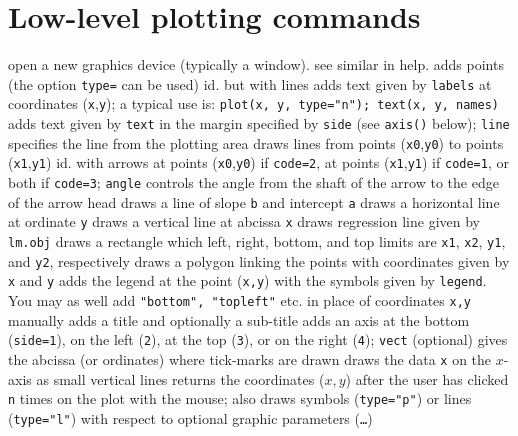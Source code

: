 \section{Low-level plotting commands}{}
	{open a new graphics device (typically a window). see similar in help.}
	{adds points (the option {\tt type=} can be used)}
	{ id. but with lines}
	{ adds text given by {\tt labels} at
    coordinates ({\tt x},{\tt y}); a typical use is: {\tt plot(x, y, type="n");
        text(x, y, names)}}
        	{adds text given by {\tt text} in the margin specified by {\tt side} (see {\tt axis()} below); {\tt line} specifies the line from the plotting area}
	{ draws lines from points ({\tt x0},{\tt y0})
    to points ({\tt x1},{\tt y1})}
    	{id. with arrows at points ({\tt x0},{\tt y0}) if {\tt code=2}, at points ({\tt x1},{\tt y1}) if {\tt code=1}, or both if {\tt code=3}; {\tt angle} controls the angle from the shaft of the arrow to the edge of the arrow head}
    	{draws a line of slope {\tt b} and intercept {\tt a}}
    	{ draws a horizontal line at ordinate {\tt y}}
    	{ draws a vertical line at abcissa {\tt x}}
    	{ draws regression line given by {\tt lm.obj}}
    	{ draws a rectangle which left, right, bottom, and top limits are {\tt x1}, {\tt x2}, {\tt y1}, and {\tt y2}, respectively}
    	{draws a polygon linking the points with coordinates given by {\tt x} and {\tt y}}
	{ adds the legend at the point ({\tt x,y})
    with the symbols given by {\tt legend}. You may as well add {\tt "bottom", "topleft"} etc. in place of coordinates {\tt x,y} manually}
        	{ adds a title and optionally a sub-title}
        	{adds an axis at the bottom ({\tt side=1}), on the left ({\tt 2}), at the top ({\tt 3}), or on the right ({\tt 4}); {\tt vect} (optional) gives the abcissa (or ordinates) where tick-marks are drawn}
        	{draws the data {\tt x} on the $x$-axis as small vertical lines}
        	{returns the coordinates ($x,y$) after the
            user has clicked {\tt n} times on the plot with the mouse; also draws
                symbols ({\tt type="p"}) or lines ({\tt type="l"}) with respect to optional
                graphic parameters ({\tt \ldots})}

